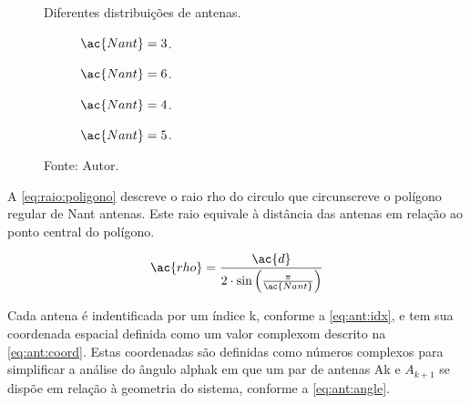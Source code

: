 \begin{figure}[htbp]
    \centering
    \caption{Diferentes distribuições de antenas.}
    \label{fig:antennas}

    \hfill
    \begin{subfigure}[c]{0.4\textwidth}
        \centering
        \caption{$ \ac{Nant} = 3 $.}
        
        \label{fig:antennas:3}
    \end{subfigure}
    \hfill
    \begin{subfigure}[c]{0.575\textwidth}
        \centering
        \caption{$ \ac{Nant} = 6 $.}
        
        \label{fig:antennas:6}
    \end{subfigure}
    \hfill

    \vspace{\floatsep}

    \hfill
    \begin{subfigure}[c]{0.45\textwidth}
        \centering
        \caption{$ \ac{Nant} = 4 $.}
        
        \label{fig:antennas:4}
    \end{subfigure}
    \hfill
    \begin{subfigure}[c]{0.5\textwidth}
        \centering
        \caption{$ \ac{Nant} = 5 $.}
        
        \label{fig:antennas:5}
    \end{subfigure}
    \hfill

    \caption*{Fonte: Autor.}
\end{figure}

A \autoref{eq:raio:poligono} descreve o raio \ac{rho} do circulo que circunscreve o polígono regular de \ac{Nant} antenas.
Este raio equivale à distância das antenas em relação ao ponto central do polígono.

\begin{equation} \label{eq:raio:poligono} %
	\ac{rho} = \frac{\ac{d}}{2\cdot \sin\left(\frac{\pi}{\ac{Nant}}\right)}
\end{equation}

Cada antena é indentificada por um índice \ac{k}, conforme a \autoref{eq:ant:idx}, e tem sua coordenada espacial definida como um valor complexom descrito na \autoref{eq:ant:coord}.
Estas coordenadas são definidas como números complexos para simplificar a análise do ângulo \ac{alphak} em que um par de antenas \ac{Ak} e $A_{k+1}$ se dispõe em relação à geometria do sistema, conforme a \autoref{eq:ant:angle}.

